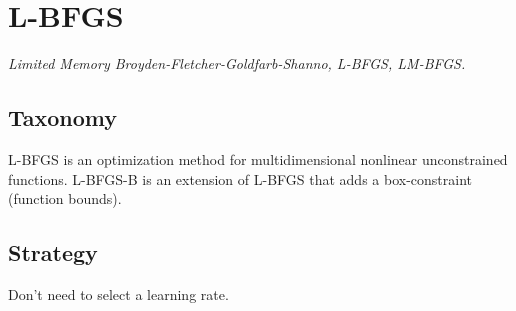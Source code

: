 
\section{L-BFGS} 
\label{sec:lbfgs}

\emph{Limited Memory Broyden-Fletcher-Goldfarb-Shanno, L-BFGS, LM-BFGS.}

\subsection{Taxonomy}
L-BFGS is an optimization method for multidimensional nonlinear unconstrained functions.
L-BFGS-B is an extension of L-BFGS that adds a box-constraint (function bounds).

\subsection{Strategy}

Don't need to select a learning rate.


